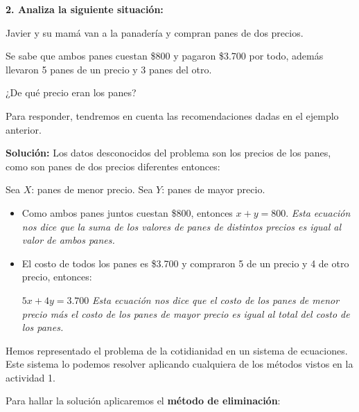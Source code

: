 \documentclass[12pt,a4paper]{article}
\begin{document}
\noindent{}


\vspace{1cm}

\textbf{2. Analiza la siguiente situación:}

\begin{tcolorbox}[colback=fondoazul,colframe=azuloscuro,breakable]

Javier y su mamá van a la panadería y compran panes de dos precios.

Se sabe que ambos panes cuestan \$800 y pagaron \$3.700 por todo, además llevaron 5 panes de un precio y 3 panes del otro.

¿De qué precio eran los panes?

\end{tcolorbox}

Para responder, tendremos en cuenta las recomendaciones dadas en el ejemplo anterior.

\textbf{Solución:} Los datos desconocidos del problema son los precios de los panes, como son panes de dos precios diferentes entonces:

Sea $X$: panes de menor precio. \quad Sea $Y$: panes de mayor precio.

\begin{itemize}
    \item Como ambos panes juntos cuestan \$800, entonces $x + y = 800$. \textit{Esta ecuación nos dice que la suma de los valores de panes de distintos precios es igual al valor de ambos panes.}

    \item El costo de todos los panes es \$3.700 y compraron 5 de un precio y 4 de otro precio, entonces:

    $5x + 4y = 3.700$ \textit{Esta ecuación nos dice que el costo de los panes de menor precio más el costo de los panes de mayor precio es igual al total del costo de los panes.}
\end{itemize}

Hemos representado el problema de la cotidianidad en un sistema de ecuaciones. Este sistema lo podemos resolver aplicando cualquiera de los métodos vistos en la actividad 1.

Para hallar la solución aplicaremos el \textbf{método de eliminación}:
\end{document}
